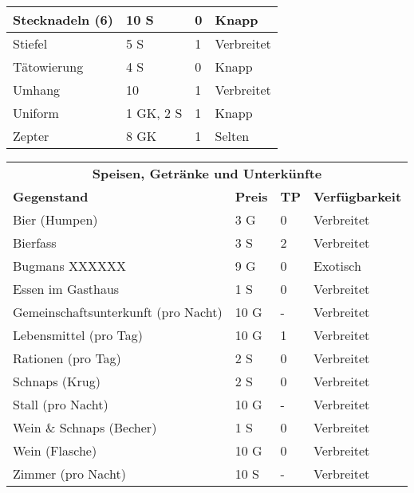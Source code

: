 \documentclass[a4paper, 9pt]{scrreprt}
\begin{document}
\begin{table}[!ht]
\begin{tabular}{llll}
        Stecknadeln (6)     & 10 S           & 0           & Knapp                  \\ \hline
        Stiefel             & 5 S            & 1           & Verbreitet             \\ \hline
        Tätowierung         & 4 S            & 0           & Knapp                  \\ \hline
        Umhang              & 10             & 1           & Verbreitet             \\ \hline
        Uniform             & 1 GK, 2 S      & 1           & Knapp                  \\ \hline
        Zepter              & 8 GK           & 1           & Selten
    \end{tabular}%
\end{table}

\begin{table}[!ht]
    \renewcommand{\arraystretch}{1.2}
    \begin{tabular}{llll}
        \multicolumn{4}{c}{\cellcolor{gray!25}\textbf{Speisen, Getränke und Unterkünfte}}           \\
        \textbf{Gegenstand}                 & \textbf{Preis} & \textbf{TP} & \textbf{Verfügbarkeit} \\
        Bier (Humpen)                       & 3 G            & 0           & Verbreitet             \\ \hline
        Bierfass                            & 3 S            & 2           & Verbreitet             \\ \hline
        Bugmans XXXXXX                      & 9 G            & 0           & Exotisch               \\ \hline
        Essen im Gasthaus                   & 1 S            & 0           & Verbreitet             \\ \hline
        Gemeinschaftsunterkunft (pro Nacht) & 10 G           & -           & Verbreitet             \\ \hline
        Lebensmittel (pro Tag)              & 10 G           & 1           & Verbreitet             \\ \hline
        Rationen (pro Tag)                  & 2 S            & 0           & Verbreitet             \\ \hline
        Schnaps (Krug)                      & 2 S            & 0           & Verbreitet             \\ \hline
        Stall (pro Nacht)                   & 10 G           & -           & Verbreitet             \\ \hline
        Wein \& Schnaps (Becher)            & 1 S            & 0           & Verbreitet             \\ \hline
        Wein (Flasche)                      & 10 G           & 0           & Verbreitet             \\ \hline
        Zimmer (pro Nacht)                  & 10 S           & -           & Verbreitet
    \end{tabular}%
\end{table}
\end{document}
